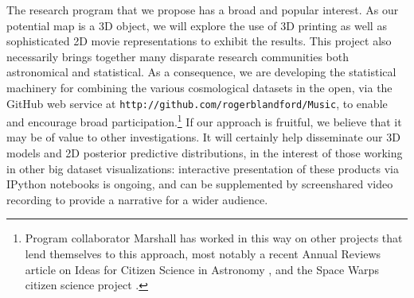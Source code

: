 \documentclass[psfig,12pt]{article}
\begin{document}
{The research program that we propose has a broad and popular interest.
As our potential map is a 3D object,
we will explore the use of 3D printing as well as sophisticated 2D movie
representations to exhibit the results. This project also necessarily
brings together many disparate research communities both astronomical
and statistical. As a consequence, we are developing the statistical
machinery for combining the various cosmological datasets in the open,
via the GitHub web service at
\texttt{http://github.com/rogerblandford/Music}, to enable and encourage
broad participation.\footnote{Program collaborator Marshall has worked in this way on other
projects that lend themselves to this approach, most notably a recent
Annual Reviews article on Ideas for Citizen Science in Astronomy
\cite{CitSciReview}, and the Space Warps citizen science project
\cite{SpaceWarps}.}
If our approach is fruitful, we believe that it may be of value to other
investigations. It will certainly help disseminate our 3D models and 2D
posterior predictive distributions, in the interest of those working in
other big dataset visualizations: interactive presentation of these
products via IPython notebooks is ongoing, and can be supplemented by
screenshared video recording to provide a narrative for a wider
audience.



}
\end{document}
